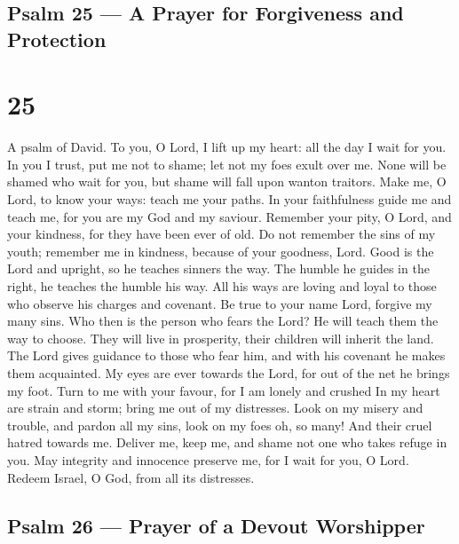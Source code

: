 \hypertarget{psalm-25-a-prayer-for-forgiveness-and-protection}{%
\subsection{Psalm 25 --- A Prayer for Forgiveness and
Protection}\label{psalm-25-a-prayer-for-forgiveness-and-protection}}

\hypertarget{section-24}{%
\section{25}\label{section-24}}

A psalm of David.  To you, O Lord, I lift up my heart: all
the day I wait for you.  In you I trust, put me not to
shame; let not my foes exult over me.  None will be shamed
who wait for you, but shame will fall upon wanton traitors. 
Make me, O Lord, to know your ways: teach me your paths.  In
your faithfulness guide me and teach me, for you are my God and my
saviour.  Remember your pity, O Lord, and your kindness, for
they have been ever of old.  Do not remember the sins of my
youth; remember me in kindness, because of your goodness, Lord.
 Good is the Lord and upright, so he teaches sinners the
way.  The humble he guides in the right, he teaches the
humble his way.  All his ways are loving and loyal to those
who observe his charges and covenant.  Be true to your name
Lord, forgive my many sins.  Who then is the person who
fears the Lord? He will teach them the way to choose.  They
will live in prosperity, their children will inherit the land.
 The Lord gives guidance to those who fear him, and with
his covenant he makes them acquainted.  My eyes are ever
towards the Lord, for out of the net he brings my foot. 
Turn to me with your favour, for I am lonely and crushed 
In my heart are strain and storm; bring me out of my distresses.
 Look on my misery and trouble, and pardon all my sins,
 look on my foes oh, so many! And their cruel hatred
towards me.  Deliver me, keep me, and shame not one who
takes refuge in you.  May integrity and innocence preserve
me, for I wait for you, O Lord.  Redeem Israel, O God, from
all its distresses.

\hypertarget{psalm-26-prayer-of-a-devout-worshipper}{%
\subsection{Psalm 26 --- Prayer of a Devout
Worshipper}\label{psalm-26-prayer-of-a-devout-worshipper}}

